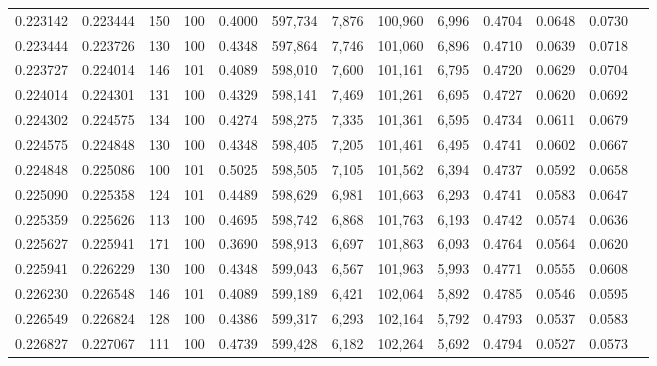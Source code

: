 \begin{tabular}{rrrrrrrrrrrrr}
0.223142 & 0.223444 &   150 & 100 &                                     0.4000 & 597,734 &   7,876 & 100,960 &   6,996 & 0.4704 & 0.0648 & 0.0730 \\
0.223444 & 0.223726 &   130 & 100 &                                     0.4348 & 597,864 &   7,746 & 101,060 &   6,896 & 0.4710 & 0.0639 & 0.0718 \\
0.223727 & 0.224014 &   146 & 101 &                                     0.4089 & 598,010 &   7,600 & 101,161 &   6,795 & 0.4720 & 0.0629 & 0.0704 \\
0.224014 & 0.224301 &   131 & 100 &                                     0.4329 & 598,141 &   7,469 & 101,261 &   6,695 & 0.4727 & 0.0620 & 0.0692 \\
0.224302 & 0.224575 &   134 & 100 &                                     0.4274 & 598,275 &   7,335 & 101,361 &   6,595 & 0.4734 & 0.0611 & 0.0679 \\
0.224575 & 0.224848 &   130 & 100 &                                     0.4348 & 598,405 &   7,205 & 101,461 &   6,495 & 0.4741 & 0.0602 & 0.0667 \\
0.224848 & 0.225086 &   100 & 101 &                                     0.5025 & 598,505 &   7,105 & 101,562 &   6,394 & 0.4737 & 0.0592 & 0.0658 \\
0.225090 & 0.225358 &   124 & 101 &                                     0.4489 & 598,629 &   6,981 & 101,663 &   6,293 & 0.4741 & 0.0583 & 0.0647 \\
0.225359 & 0.225626 &   113 & 100 &                                     0.4695 & 598,742 &   6,868 & 101,763 &   6,193 & 0.4742 & 0.0574 & 0.0636 \\
0.225627 & 0.225941 &   171 & 100 &                                     0.3690 & 598,913 &   6,697 & 101,863 &   6,093 & 0.4764 & 0.0564 & 0.0620 \\
0.225941 & 0.226229 &   130 & 100 &                                     0.4348 & 599,043 &   6,567 & 101,963 &   5,993 & 0.4771 & 0.0555 & 0.0608 \\
0.226230 & 0.226548 &   146 & 101 &                                     0.4089 & 599,189 &   6,421 & 102,064 &   5,892 & 0.4785 & 0.0546 & 0.0595 \\
0.226549 & 0.226824 &   128 & 100 &                                     0.4386 & 599,317 &   6,293 & 102,164 &   5,792 & 0.4793 & 0.0537 & 0.0583 \\
0.226827 & 0.227067 &   111 & 100 &                                     0.4739 & 599,428 &   6,182 & 102,264 &   5,692 & 0.4794 & 0.0527 & 0.0573 \\

\end{tabular}
